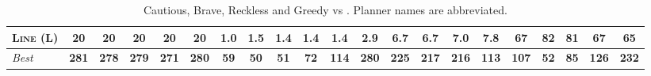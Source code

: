 \begin{table}[tb]
{\begin{tabular}{|l||ccccc||ccccc||ccccc||ccccc||}
\textsc{Line} (L)&\textbf{20}&\textbf{20}&\textbf{20}&\textbf{20}&\textbf{20}&\textbf{1.0}&1.5&1.4&1.4&1.4&\textbf{2.9}&6.7&6.7&7.0&7.8&67&82&81&67&\textbf{65}
\\\hline
\textit{Best}&\textbf{281}&\textbf{278}&\textbf{279}&\textbf{271}&\textbf{280}&\textbf{59}&\textbf{50}&\textbf{51}&\textbf{72}&\textbf{114}&\textbf{280}&\textbf{225}&\textbf{217}&\textbf{216}&\textbf{113}&\textbf{107}&\textbf{52}&\textbf{85}&\textbf{126}&\textbf{232}\\\hline

        \end{tabular}}
        \caption{Cautious, Brave, Reckless and Greedy \pattyd vs \pattyo. Planner names are abbreviated.}
        \label{tab:cbrg}
        \end{table}
        